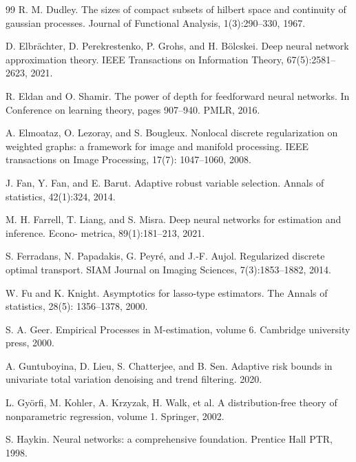 \documentclass[twoside,11pt]{article}
\begin{document}
\begin{thebibliography}{99}
 R. M. Dudley. The sizes of compact subsets of hilbert space and continuity of gaussian processes. Journal of Functional Analysis, 1(3):290--330, 1967.

 D. Elbrächter, D. Perekrestenko, P. Grohs, and H. Bölcskei. Deep neural network approximation theory. IEEE Transactions on Information Theory, 67(5):2581--2623, 2021.

 R. Eldan and O. Shamir. The power of depth for feedforward neural networks. In Conference on learning theory, pages 907--940. PMLR, 2016.

 A. Elmoataz, O. Lezoray, and S. Bougleux. Nonlocal discrete regularization on weighted graphs: a framework for image and manifold processing. IEEE transactions on Image Processing, 17(7): 1047--1060, 2008.

 J. Fan, Y. Fan, and E. Barut. Adaptive robust variable selection. Annals of statistics, 42(1):324, 2014.

 M. H. Farrell, T. Liang, and S. Misra. Deep neural networks for estimation and inference. Econo- metrica, 89(1):181--213, 2021.

 S. Ferradans, N. Papadakis, G. Peyré, and J.-F. Aujol. Regularized discrete optimal transport. SIAM Journal on Imaging Sciences, 7(3):1853--1882, 2014.

 W. Fu and K. Knight. Asymptotics for lasso-type estimators. The Annals of statistics, 28(5): 1356--1378, 2000.

 S. A. Geer. Empirical Processes in M-estimation, volume 6. Cambridge university press, 2000.

 A. Guntuboyina, D. Lieu, S. Chatterjee, and B. Sen. Adaptive risk bounds in univariate total variation denoising and trend filtering. 2020.

 L. Györfi, M. Kohler, A. Krzyzak, H. Walk, et al. A distribution-free theory of nonparametric regression, volume 1. Springer, 2002.

 S. Haykin. Neural networks: a comprehensive foundation. Prentice Hall PTR, 1998.


\end{thebibliography}
\end{document}

